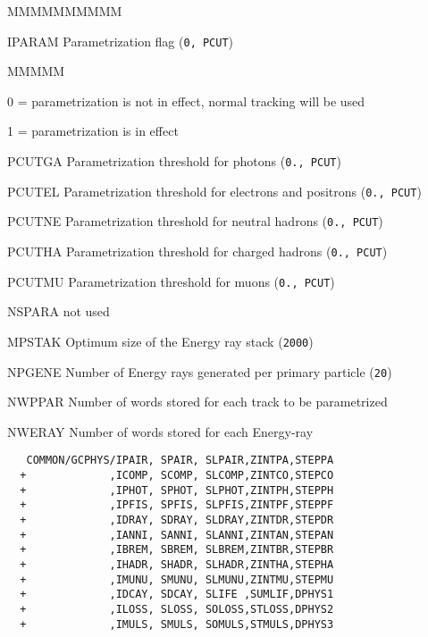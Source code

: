 \begin{DLtt}{MMMMMMMMMM}
\item[IPARAM]Parametrization flag ({\tt 0, PCUT})
\begin{DLtt}{MMMMM}
\item[0 =]parametrization is not in effect, normal tracking will be used
\item[1 =]parametrization is in effect
\end{DLtt}
\item[PCUTGA]Parametrization threshold for photons ({\tt 0.,  PCUT})
\item[PCUTEL]Parametrization threshold for electrons and positrons
({\tt 0.,  PCUT})
\item[PCUTNE]Parametrization threshold for neutral hadrons
({\tt 0., PCUT})
\item[PCUTHA]Parametrization threshold for charged hadrons
({\tt 0., PCUT})
\item[PCUTMU]Parametrization threshold for muons
({\tt 0.,  PCUT})
\item[NSPARA] not used
\item[MPSTAK] Optimum size of the Energy ray stack ({\tt 2000})
\item[NPGENE] Number of Energy rays generated per primary particle
({\tt 20})
\item[NWPPAR] Number of words stored for each track to be parametrized
\item[NWERAY] Number of words stored for each Energy-ray
\end{DLtt}
\begin{verbatim}
   COMMON/GCPHYS/IPAIR, SPAIR, SLPAIR,ZINTPA,STEPPA
  +             ,ICOMP, SCOMP, SLCOMP,ZINTCO,STEPCO
  +             ,IPHOT, SPHOT, SLPHOT,ZINTPH,STEPPH
  +             ,IPFIS, SPFIS, SLPFIS,ZINTPF,STEPPF
  +             ,IDRAY, SDRAY, SLDRAY,ZINTDR,STEPDR
  +             ,IANNI, SANNI, SLANNI,ZINTAN,STEPAN
  +             ,IBREM, SBREM, SLBREM,ZINTBR,STEPBR
  +             ,IHADR, SHADR, SLHADR,ZINTHA,STEPHA
  +             ,IMUNU, SMUNU, SLMUNU,ZINTMU,STEPMU
  +             ,IDCAY, SDCAY, SLIFE ,SUMLIF,DPHYS1
  +             ,ILOSS, SLOSS, SOLOSS,STLOSS,DPHYS2
  +             ,IMULS, SMULS, SOMULS,STMULS,DPHYS3
 
\end{verbatim}
